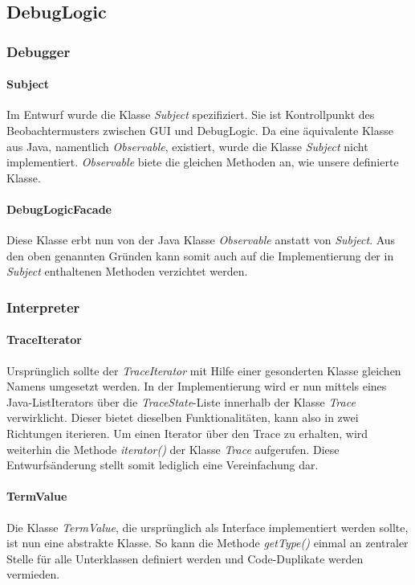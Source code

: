 \documentclass[parskip=full]{scrartcl}
\begin{document}
\subsection{DebugLogic}
\subsubsection{Debugger}
\paragraph{Subject}
Im Entwurf wurde die Klasse \textit{Subject} spezifiziert. Sie ist Kontrollpunkt des Beobachtermusters zwischen GUI und DebugLogic. Da eine äquivalente Klasse aus Java, namentlich \textit{Observable}, existiert, wurde die Klasse \textit{Subject} nicht implementiert.
\textit{Observable} biete die gleichen Methoden an, wie unsere definierte Klasse.
\paragraph{DebugLogicFacade}
Diese Klasse erbt nun von der Java Klasse \textit{Observable} anstatt von \textit{Subject}.
Aus den oben genannten Gründen kann somit auch auf die Implementierung der in \textit{Subject} enthaltenen Methoden verzichtet werden.

\subsubsection{Interpreter}
\paragraph{TraceIterator}
Ursprünglich sollte der \textit{TraceIterator} mit Hilfe einer gesonderten Klasse gleichen Namens umgesetzt werden. In der Implementierung wird er nun mittels eines Java-ListIterators über die \textit{TraceState}-Liste innerhalb der Klasse \textit{Trace} verwirklicht. Dieser bietet dieselben Funktionalitäten, kann also in zwei Richtungen iterieren. Um einen Iterator über den Trace zu erhalten, wird weiterhin die Methode \textit{iterator()} der Klasse \textit{Trace} aufgerufen. Diese Entwurfsänderung stellt somit lediglich eine Vereinfachung dar.
\paragraph{TermValue}
Die Klasse \textit{TermValue}, die ursprünglich als Interface implementiert werden sollte, ist nun eine abstrakte Klasse. So kann die Methode \textit{getType()} einmal an zentraler Stelle für alle Unterklassen definiert werden und Code-Duplikate werden vermieden.
\end{document}
